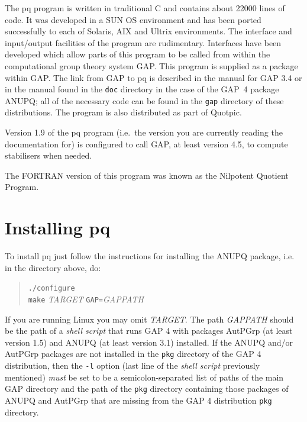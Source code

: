 \documentclass[12pt]{article}
\begin{document}
The pq program is written in traditional C and contains about 
22000 lines of code.
It was developed in a SUN OS environment and has been ported successfully
to each of Solaris, AIX and Ultrix environments.  The interface and 
input/output facilities of the program are rudimentary.  Interfaces 
have been developed which allow parts of this program to be called
from within the computational group theory system {\sf GAP}.  
This program is supplied as a package within {\sf GAP}.
The link from {\sf GAP} to pq is described in the manual
for {\sf GAP} 3.4 or in the manual found in the \texttt{doc} directory
in the case of the {\sf GAP}~4 package {\sf ANUPQ}; all of the 
necessary code can be found in the \texttt{gap} directory of these 
distributions.
The program is also distributed as part of Quotpic.

Version 1.9 of the pq program (i.e.~the version you are currently reading
the documentation for) is configured to call {\sf GAP}, at least version
4.5, to compute stabilisers when needed.

The FORTRAN version of this program was known as the 
Nilpotent Quotient Program.

\section{Installing pq}\label{sec:pq-install}

To install pq just follow the instructions for installing the {\sf ANUPQ}
package, i.e. in the directory above, do:

\begin{quote}
\verb|./configure|\\
\verb|make| \textit{TARGET} \verb|GAP=|\textit{GAPPATH}
\end{quote}

If you are running Linux you may omit \textit{TARGET}. The path 
\textit{GAPPATH} should be the path of a \emph{shell script} that runs
{\sf GAP} 4 with packages {\sf AutPGrp} (at least version 1.5) and
{\sf ANUPQ} (at least version 3.1)
installed. If the {\sf ANUPQ} and/or {\sf AutPGrp} packages are not installed
in the \texttt{pkg} directory of the {\sf GAP} 4 distribution, then
the \texttt{-l} option (last line of the \emph{shell script} previously
mentioned) \emph{must} be set to be a semicolon-separated list of
paths of the main {\sf GAP} directory and the path of the \texttt{pkg}
directory containing those packages of {\sf ANUPQ} and {\sf AutPGrp}
that are missing from the {\sf GAP} 4 distribution \texttt{pkg} directory.
\end{document}
